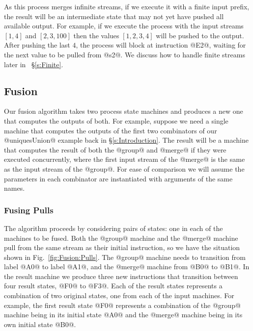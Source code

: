 As this process merges infinite streams, if we execute it with a finite input prefix, the result will be an intermediate state that may not yet have pushed all available output. For example, if we execute the process with the input streams $[1, 4]$ and $[2, 3, 100]$ then the values $[1, 2, 3, 4]$ will be pushed to the output.
After pushing the last $4$, the process will block at instruction @E2@, waiting for the next value to be pulled from @s2@. We discuss how to handle finite streams later in ~\S\ref{s:Finite}.


\subsection{Fusion}
Our fusion algorithm takes two process state machines and produces a new one that computes the outputs of both. For example, suppose we need a single machine that computes the outputs of the first two combinators of our @uniquesUnion@ example back in \S\ref{s:Introduction}. The result will be a machine that computes the result of both the @group@ and @merge@ if they were executed concurrently, where the first input stream of the @merge@ is the same as the input stream of the @group@. For ease of comparison we will assume the parameters in each combinator are instantiated with arguments of the same names.


\subsubsection{Fusing Pulls}

The algorithm proceeds by considering pairs of states: one in each of the machines to be fused.
Both the @group@ machine and the @merge@ machine pull from the same stream as their initial instruction, so we have the situation shown in Fig.~\ref{fig:Fusion:Pulls}.
The @group@ machine needs to transition from label @A0@ to label @A1@, and the @merge@ machine from @B0@ to @B1@.
In the result machine we produce three new instructions that transition between four result states, @F0@ to @F3@.
Each of the result states represents a combination of two original states, one from each of the input machines.
For example, the first result state @F0@ represents a combination of the @group@ machine being in its initial state @A0@ and the @merge@ machine being in its own initial state @B0@. 

